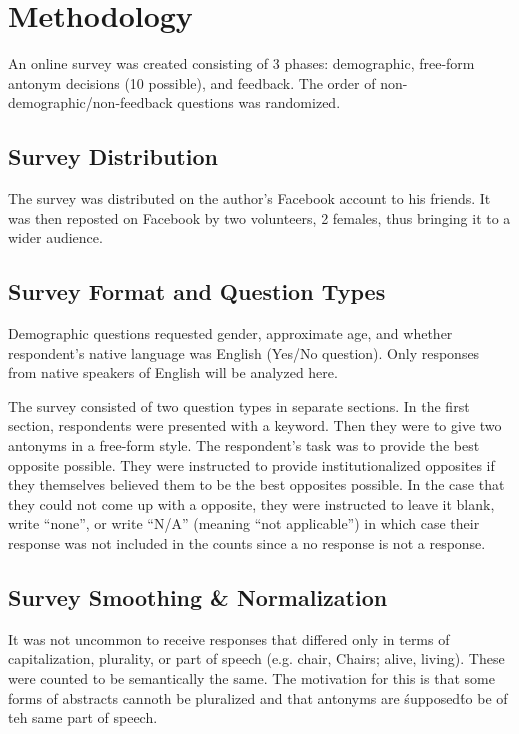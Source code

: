 \section {Methodology}
An online survey was created consisting of 3 phases: demographic, free-form antonym decisions (10 possible), and feedback.  The order of non-demographic/non-feedback questions was randomized.  %

\subsection{Survey Distribution} The survey was distributed on the author’s Facebook account to his friends.  It was then reposted on Facebook by two volunteers, 2 females, thus bringing it to a wider audience.  

\subsection{Survey Format and Question Types} Demographic questions requested gender, approximate age, and whether respondent’s native language was English (Yes/No question).  Only responses from native speakers of English will be analyzed here. 

The survey consisted of two question types in separate sections. In the first section, respondents were presented with a keyword. Then they were to give two antonyms in a free-form style. The respondent’s task was to provide the best opposite possible.  They were instructed to provide institutionalized opposites if they themselves believed them to be the best opposites possible. In the case that they could not come up with a opposite, they were instructed to leave it blank, write ``none'', or write ``N/A'' (meaning ``not applicable'') in which case their response was not included in the counts since a no response is not a response.  

\subsection{Survey Smoothing \& Normalization} It was not uncommon to receive responses that differed only in terms of capitalization, plurality, or part of speech (e.g. chair, Chairs; alive, living).  These were counted to be semantically the same.  The motivation for this is that some forms of abstracts cannoth be pluralized and that antonyms are \'supposed\' to be of teh same part of speech.

